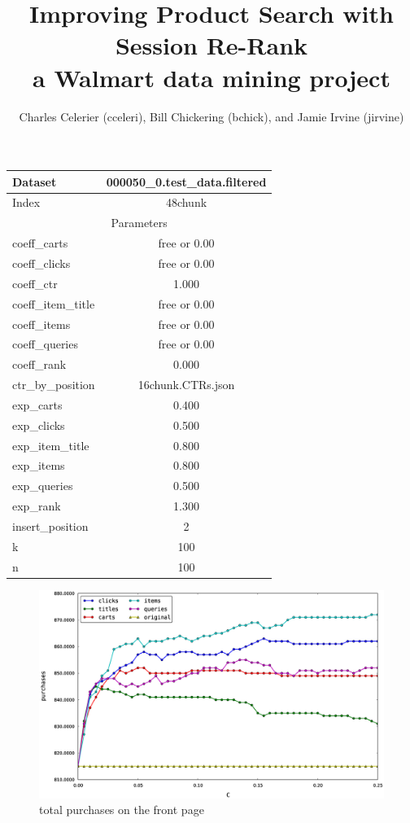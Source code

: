 \documentclass{article}
\title{Improving Product Search with Session Re-Rank\\
    \large{a Walmart data mining project}}
\author{Charles Celerier (cceleri), Bill Chickering (bchick),
        and Jamie Irvine (jirvine)}
\begin{document}
\maketitle

\begin{center}
    \begin{tabular}{| l | c |}
        \hline
        Dataset & 000050\_0.test\_data.filtered \\ \hline
        Index & 48chunk \\ \hline
        \hline
        \multicolumn{2}{|c|}{Parameters} \\ \hline
        coeff\_carts & free or 0.00 \\ \hline
        coeff\_clicks & free or 0.00 \\ \hline
        coeff\_ctr & 1.000 \\ \hline
        coeff\_item\_title & free or 0.00 \\ \hline
        coeff\_items & free or 0.00 \\ \hline
        coeff\_queries & free or 0.00 \\ \hline
        coeff\_rank & 0.000 \\ \hline
        ctr\_by\_position & 16chunk.CTRs.json \\ \hline
        exp\_carts & 0.400 \\ \hline
        exp\_clicks & 0.500 \\ \hline
        exp\_item\_title & 0.800 \\ \hline
        exp\_items & 0.800 \\ \hline
        exp\_queries & 0.500 \\ \hline
        exp\_rank & 1.300 \\ \hline
        insert\_position & 2 \\ \hline
        k & 100 \\ \hline
        n & 100 \\ \hline
  \end{tabular}
\end{center}

\begin{figure}[htbp!]
\centering
\includegraphics[width=\textwidth]{000050_0.48chunk.k100.i2.n100.total_purchased_front_page.0-0.25.eps}
\caption{total purchases on the front page}
\label{fig:total_purchases_on_the_front_page}
\end{figure}
\end{document}
